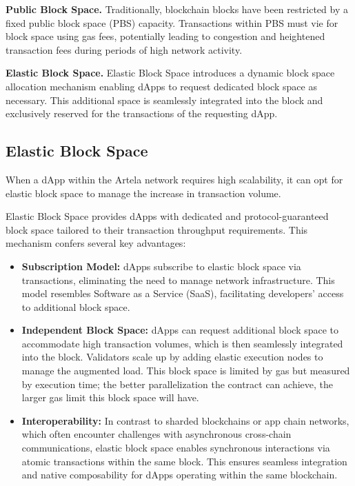 \textbf{Public Block Space.} Traditionally, blockchain blocks have been restricted by a fixed public block space (PBS) capacity. Transactions within PBS must vie for block space using gas fees, potentially leading to congestion and heightened transaction fees during periods of high network activity.

\textbf{Elastic Block Space.} Elastic Block Space introduces a dynamic block space allocation mechanism enabling dApps to request dedicated block space as necessary. This additional space is seamlessly integrated into the block and exclusively reserved for the transactions of the requesting dApp.

\subsection{Elastic Block Space}

When a dApp within the Artela network requires high scalability, it can opt for elastic block space to manage the increase in transaction volume.

Elastic Block Space provides dApps with dedicated and protocol-guaranteed block space tailored to their transaction throughput requirements. This mechanism confers several key advantages:

\begin{itemize}
\item \textbf{Subscription Model:} dApps subscribe to elastic block space via transactions, eliminating the need to manage network infrastructure. This model resembles Software as a Service (SaaS), facilitating developers' access to additional block space.
\item \textbf{Independent Block Space:} dApps can request additional block space to accommodate high transaction volumes, which is then seamlessly integrated into the block. Validators scale up by adding elastic execution nodes to manage the augmented load. This block space is limited by gas but measured by execution time; the better parallelization the contract can achieve, the larger gas limit this block space will have.
\item \textbf{Interoperability:} In contrast to sharded blockchains or app chain networks, which often encounter challenges with asynchronous cross-chain communications, elastic block space enables synchronous interactions via atomic transactions within the same block. This ensures seamless integration and native composability for dApps operating within the same blockchain.
\end{itemize}

